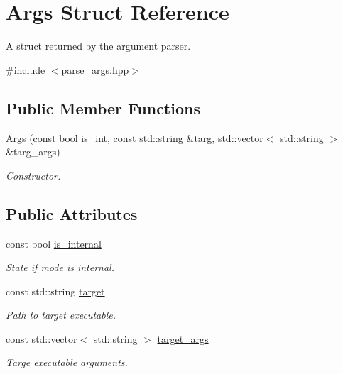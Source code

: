 \hypertarget{struct_args}{}\section{Args Struct Reference}
\label{struct_args}


A struct returned by the argument parser.  




{\ttfamily \#include $<$parse\+\_\+args.\+hpp$>$}

\subsection*{Public Member Functions}
\begin{DoxyCompactItemize}
\item 
\hyperlink{struct_args_a8ac9d30553b5fd1c8b6589cc9dd952ef}{Args} (const bool is\+\_\+int, const std\+::string \&targ, std\+::vector$<$ std\+::string $>$ \&targ\+\_\+args)
\begin{DoxyCompactList}\small\item\em Constructor. \end{DoxyCompactList}\end{DoxyCompactItemize}
\subsection*{Public Attributes}
\begin{DoxyCompactItemize}
\item 
const bool \hyperlink{struct_args_a52d1f8c8297b000e30ff84b9ff1b9321}{is\+\_\+internal}
\begin{DoxyCompactList}\small\item\em State if mode is internal. \end{DoxyCompactList}\item 
const std\+::string \hyperlink{struct_args_a49f5255b7466ee4e1329aa32ca069da6}{target}
\begin{DoxyCompactList}\small\item\em Path to target executable. \end{DoxyCompactList}\item 
const std\+::vector$<$ std\+::string $>$ \hyperlink{struct_args_aa9f8e387df0b3691352daf352876176d}{target\+\_\+args}
\begin{DoxyCompactList}\small\item\em Targe executable arguments. \end{DoxyCompactList}\end{DoxyCompactItemize}



